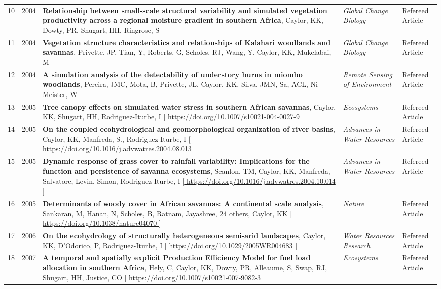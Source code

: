 \begin{supertabular}{lcp{8.25cm}p{4.75cm}p{1.75cm}}
10 & 2004 & {\bf Relationship between small-scale structural variability and simulated vegetation productivity across a regional moisture gradient in southern Africa}, Caylor, KK, Dowty, PR, Shugart, HH, Ringrose, S  & \emph{ Global Change Biology } & Refereed Article\\
11 & 2004 & {\bf Vegetation structure characteristics and relationships of Kalahari woodlands and savannas}, Privette, JP, Tian, Y, Roberts, G, Scholes, RJ, Wang, Y, Caylor, KK, Mukelabai, M  & \emph{ Global Change Biology } & Refereed Article\\
12 & 2004 & {\bf A  simulation analysis of the detectability of understory burns in miombo woodlands}, Pereira, JMC, Mota, B, Privette, JL, Caylor, KK, Silva, JMN, Sa, ACL, Ni-Meister, W  & \emph{ Remote Sensing of Environment } & Refereed Article\\
13 & 2005 & {\bf Tree canopy effects on simulated water stress in southern African savannas}, Caylor, KK, Shugart, HH, Rodriguez-Iturbe, I [\url{ https://doi.org/10.1007/s10021-004-0027-9 }] & \emph{ Ecosystems } & Refereed Article\\
14 & 2005 & {\bf On the coupled ecohydrological and geomorphological organization of river basins}, Caylor, KK, Manfreda, S., Rodriguez-Iturbe, I [\url{ https://doi.org/10.1016/j.advwatres.2004.08.013 }] & \emph{ Advances in Water Resources } & Refereed Article\\
15 & 2005 & {\bf Dynamic response of grass cover to rainfall variability: Implications for the function and persistence of savanna ecosystems}, Scanlon, TM, Caylor, KK, Manfreda, Salvatore, Levin, Simon, Rodriguez-Iturbe, I [\url{ https://doi.org/10.1016/j.advwatres.2004.10.014 }] & \emph{ Advances in Water Resources } & Refereed Article\\
16 & 2005 & {\bf Determinants of woody cover in African savannas: A continental scale analysis}, Sankaran, M, Hanan, N, Scholes, B, Ratnam, Jayashree, 24 others, Caylor, KK [\url{ https://doi.org/10.1038/nature04070 }] & \emph{ Nature } & Refereed Article\\
17 & 2006 & {\bf On the ecohydrology of structurally heterogeneous semi-arid landscapes}, Caylor, KK, D'Odorico, P, Rodriguez-Iturbe, I [\url{ https://doi.org/10.1029/2005WR004683 }] & \emph{ Water Resources Research } & Refereed Article\\
18 & 2007 & {\bf A temporal and spatially explicit Production Efficiency Model for fuel load allocation in southern Africa}, Hely, C, Caylor, KK, Dowty, PR, Alleaume, S, Swap, RJ, Shugart, HH, Justice, CO [\url{ https://doi.org/10.1007/s10021-007-9082-3 }] & \emph{ Ecosystems } & Refereed Article\\

\end{supertabular}
